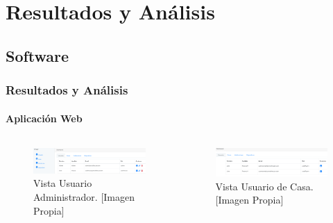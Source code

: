 \section{Resultados y Análisis}
\subsection{Software}
\begin{frame}[t]
\frametitle{Resultados y Análisis}
\framesubtitle{Aplicación Web}
\begin{columns}[t]
	\begin{figure}[!]
		\centering
		\caption{Vista Usuario Administrador. [Imagen Propia]}
		\label{fig:adminview}
		\includegraphics[width=1.1\linewidth]{Imagenes/Admin_view}
	\end{figure}
	
	\begin{figure}[!]
		\centering
		\caption{Vista Usuario de Casa. [Imagen Propia]}
		\label{fig:houseview}
		\includegraphics[width=\linewidth]{Imagenes/UserH_view}
	\end{figure}

\end{columns}
\end{frame}

